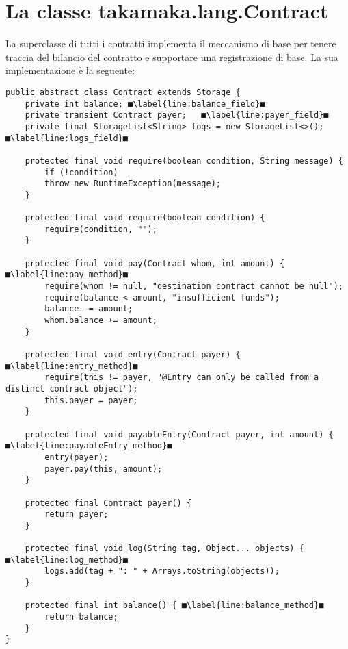 \section{La classe takamaka.lang.Contract} \label{takamaka:la-classe-contract}
La superclasse di tutti i contratti implementa il meccanismo di base per tenere traccia del bilancio del contratto e supportare una registrazione di base. La sua implementazione è la seguente:
%
\begin{lstlisting}
public abstract class Contract extends Storage {
	private int balance; ■\label{line:balance_field}■
	private transient Contract payer;   ■\label{line:payer_field}■
	private final StorageList<String> logs = new StorageList<>(); ■\label{line:logs_field}■
	
	protected final void require(boolean condition, String message) {
		if (!condition)
		throw new RuntimeException(message);
	}
	
	protected final void require(boolean condition) {
		require(condition, "");
	}
	
	protected final void pay(Contract whom, int amount) { ■\label{line:pay_method}■
		require(whom != null, "destination contract cannot be null");
		require(balance < amount, "insufficient funds");
		balance -= amount;
		whom.balance += amount;
	}
	
	protected final void entry(Contract payer) { ■\label{line:entry_method}■
		require(this != payer, "@Entry can only be called from a distinct contract object");
		this.payer = payer;
	}
	
	protected final void payableEntry(Contract payer, int amount) { ■\label{line:payableEntry_method}■
		entry(payer);
		payer.pay(this, amount);
	}
	
	protected final Contract payer() {
		return payer;
	}
	
	protected final void log(String tag, Object... objects) { ■\label{line:log_method}■
		logs.add(tag + ": " + Arrays.toString(objects));
	}
	
	protected final int balance() { ■\label{line:balance_method}■
		return balance;
	}
}
\end{lstlisting}
%
